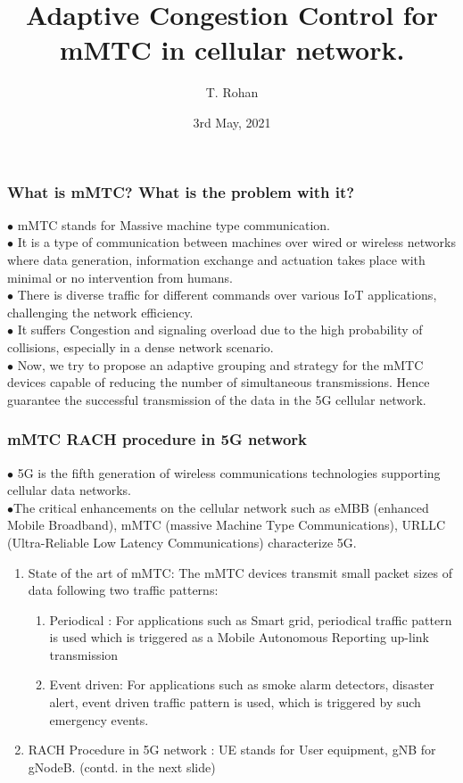 \documentclass{beamer}
\title{Adaptive Congestion Control for mMTC in cellular network.}
\author{T. Rohan}
\institute{IIT H (CSE)}
\date{3rd May, 2021}
\begin{document}
\begin{frame}
\titlepage
\end{frame}

\begin{frame}
\frametitle{What is mMTC? What is the problem with it?}

$\bullet$ mMTC stands for Massive machine type communication.\\
$\bullet$ It is a type of communication between machines over wired or wireless networks where data generation, information exchange and actuation takes place with minimal or no intervention from humans.\\
$\bullet$ There is diverse traffic for different commands over various IoT applications, challenging the network efficiency.\\
$\bullet$ It suffers Congestion and signaling overload due to the high probability of collisions, especially in a dense network scenario.\\
$\bullet$ Now, we try to propose an adaptive grouping and strategy for the mMTC devices capable of reducing the number of simultaneous transmissions. Hence guarantee the successful transmission of the
data in the 5G cellular network. 

\end{frame}

\begin{frame}
\frametitle{mMTC RACH procedure in 5G network}
$\bullet$ 5G is the fifth generation of wireless communications technologies supporting cellular data networks.\\
$\bullet$The critical enhancements on the cellular network such as eMBB (enhanced Mobile Broadband), mMTC (massive Machine Type Communications), URLLC (Ultra-Reliable Low Latency Communications) characterize 5G.

\begin{enumerate}
\item State of the art of mMTC: The mMTC devices transmit small packet sizes of data following two traffic patterns:
    \begin{enumerate}
        \item Periodical : For applications such as Smart grid, periodical traffic pattern is used which is triggered as a Mobile Autonomous Reporting up-link transmission
        \item Event driven: For applications such as smoke alarm detectors, disaster alert, event driven traffic pattern is used, which is triggered by such emergency events.
    \end{enumerate}
\item RACH Procedure in 5G network :
        UE stands for User equipment, gNB for gNodeB.                       (contd. in the next slide)
\end{enumerate}


\end{frame}
\end{document}
